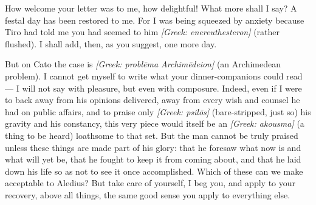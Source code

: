 

 How welcome your letter was to me, how delightful! What more shall I say? A festal day has been restored to me. For I was being squeezed by anxiety because Tiro had told me you had seemed to him \textit{[Greek: enereuthesteron]} (rather flushed). I shall add, then, as you suggest, one more day.

 But on Cato the case is \textit{[Greek: probl\=ema Archim\=edeion]} (an Archimedean problem). I cannot get myself to write what your dinner-companions could read --- I will not say with pleasure, but even with composure. Indeed, even if I were to back away from his opinions delivered, away from every wish and counsel he had on public affairs, and to praise only \textit{[Greek: psil\=os]} (bare-stripped, just so) his gravity and his constancy, this very piece would itself be an \textit{[Greek: akousma]} (a thing to be heard) loathsome to that set. But the man cannot be truly praised unless these things are made part of his glory: that he foresaw what now is and what will yet be, that he fought to keep it from coming about, and that he laid down his life so as not to see it once accomplished. Which of these can we make acceptable to Aledius? But take care of yourself, I beg you, and apply to your recovery, above all things, the same good sense you apply to everything else.
